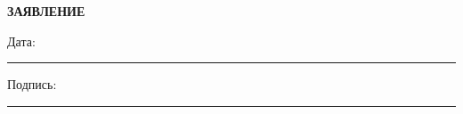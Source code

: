 \documentclass[12pt]{article}
\begin{document}
\begin{center}
\textbf{\LARGE ЗАЯВЛЕНИЕ}
\end{center}

\vspace{1cm}






\vfill

\noindent
Дата: \rule{5cm}{0.4pt} \hfill Подпись: \rule{5cm}{0.4pt}
\end{document}
